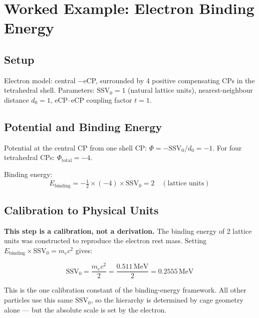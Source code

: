 \documentclass[11pt]{article}
\begin{document}
\section{Worked Example: Electron Binding Energy}

\subsection{Setup}

Electron model: central $-$eCP, surrounded by 4 positive compensating
CPs in the tetrahedral shell.  Parameters: $\text{SSV}_0 = 1$ (natural
lattice units), nearest-neighbour distance $d_0 = 1$, eCP--eCP coupling
factor $t = 1$.

\subsection{Potential and Binding Energy}

Potential at the central CP from one shell CP: $\Phi = -\text{SSV}_0/d_0 = -1$.
For four tetrahedral CPs: $\Phi_{\text{total}} = -4$.

Binding energy:
\begin{equation}
E_{\text{binding}}
= -\tfrac{1}{2} \times (-4) \times \text{SSV}_0
= 2 \quad (\text{lattice units})
\label{eq:electron_binding}
\end{equation}

\subsection{Calibration to Physical Units}

\textbf{This step is a calibration, not a derivation.}
The binding energy of 2 lattice units was constructed to reproduce the
electron rest mass.  Setting $E_{\text{binding}} \times \text{SSV}_0 = m_e c^2$
gives:

\begin{equation}
\text{SSV}_0
= \frac{m_e c^2}{2}
= \frac{0.511 \, \text{MeV}}{2}
= 0.2555 \, \text{MeV}
\label{eq:ssv0_value}
\end{equation}

This is the one calibration constant of the binding-energy framework.
All other particles use this same $\text{SSV}_0$, so the hierarchy is
determined by cage geometry alone --- but the absolute scale is set by
the electron.
\end{document}
